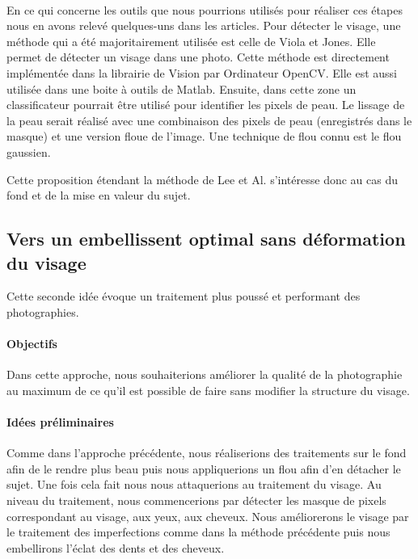 \documentclass[11pt, french]{report-rd-info}
\begin{document}
\paragraph{}
En ce qui concerne les outils que nous pourrions utilisés pour réaliser ces étapes nous en avons relevé quelques-uns dans les articles. Pour détecter le visage, une méthode qui a été majoritairement utilisée est celle de Viola et Jones. Elle permet de détecter un visage dans une photo. Cette méthode est directement implémentée dans la librairie de Vision par Ordinateur OpenCV. Elle est aussi utilisée dans une boite à outils de Matlab. Ensuite, dans cette zone un classificateur pourrait être utilisé pour identifier les pixels de peau. 
Le lissage de la peau serait réalisé avec une combinaison des pixels de peau (enregistrés dans le masque) et une version floue de l’image. Une technique de flou connu est le flou gaussien.

Cette proposition étendant la méthode de Lee et Al. s’intéresse donc au cas du fond et de la mise en valeur du sujet.

\subsection{Vers un embellissent optimal sans déformation du visage}
\label{propdeux}
Cette seconde idée évoque un traitement plus poussé et performant des photographies.

\paragraph{Objectifs}
Dans cette approche, nous souhaiterions améliorer la qualité de la photographie au maximum de ce qu’il est possible de faire sans modifier la structure du visage.

\paragraph{Idées préliminaires}
Comme dans l’approche précédente, nous réaliserions des traitements sur le fond afin de le rendre plus beau puis nous appliquerions un flou afin d’en détacher le sujet. Une fois cela fait nous nous attaquerions au traitement du visage. Au niveau du traitement, nous commencerions par détecter les masque de pixels correspondant au visage, aux yeux, aux cheveux. Nous améliorerons le visage par le traitement des imperfections comme dans la méthode précédente puis nous embellirons l’éclat des dents et des cheveux.
\end{document}
